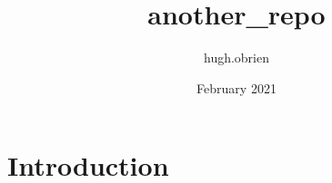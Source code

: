 \documentclass{article}
\title{another_repo}
\author{hugh.obrien }
\date{February 2021}
\begin{document}
\maketitle

\section{Introduction}
\end{document}
